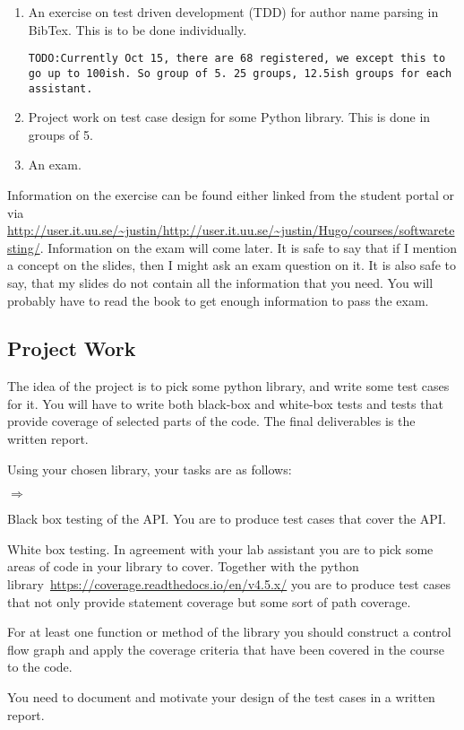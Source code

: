 \documentclass[a4paper]{article}
\newcommand{\todo}[1]{{\tt TODO:#1}}
\begin{document}
\begin{enumerate}
  \item An exercise on  test driven development (TDD) for  author name
    parsing in BibTex. This is to be done individually.
    
 \todo{Currently Oct 15, there are 68 registered, we except this to go
   up to 100ish. So group of 5. 25 groups, 12.5ish groups for each assistant.}
\item Project work on test case design for some Python library. This
  is done in groups of 5.
\item An exam.

  \end{enumerate}
  Information on the exercise can be found either linked from the
  student portal or via
  \url{http://user.it.uu.se/~justin/http://user.it.uu.se/~justin/Hugo/courses/softwaretesting/}. Information
  on the exam will come later. It is safe to say that if I mention a
  concept on the slides, then I might ask an exam question on it. It
  is also safe to say, that my slides do not contain all the
  information that you need. You will probably have to read the book
  to get enough information to pass the exam.

\subsection*{Project Work}

The idea of the project is to pick some python library, and write some
test cases for it. You will have to write both black-box and white-box
tests and tests that provide coverage of selected parts of the
code. The final deliverables is the written report.%


Using your chosen library, your tasks are as follows:
\begin{list}{$\Rightarrow$}{} 
    \item  Black box testing of the API. You are to produce test cases
      that cover the API.
    \item White box testing. In agreement with your lab assistant you
      are to pick some areas of code in your library to
      cover. Together with the python
      library~\url{https://coverage.readthedocs.io/en/v4.5.x/} you are
      to produce test cases that not only provide statement coverage
      but some sort of path coverage.
    \item For at least one function or method of the library you
      should construct a control flow graph and apply the coverage criteria
      that have been covered in the course to the code.
    \item You need to document and motivate your design of the test cases in
      a written report. 
\end{list}
\end{document}
